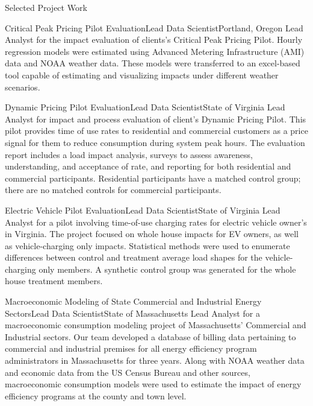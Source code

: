\documentclass{resume} %
\begin{document}
\begin{rSection}{Selected Project Work}
	\begin{rSubsection}{Critical Peak Pricing Pilot Evaluation}{}{Lead Data Scientist}{Portland, Oregon}
Lead Analyst for the impact evaluation of clients's Critical Peak Pricing Pilot. Hourly regression models were estimated using Advanced Metering Infrastructure (AMI) data and NOAA weather data. These models were transferred to an excel-based tool capable of estimating and visualizing impacts under different weather scenarios. 
	\end{rSubsection}
	
	\begin{rSubsection}{Dynamic Pricing Pilot Evaluation}{}{Lead Data Scientist}{State of Virginia}
Lead Analyst for impact and process evaluation of client's Dynamic Pricing Pilot. This pilot provides time of use rates to residential and commercial customers as a price signal for them to reduce consumption during system peak hours. The evaluation report includes a load impact analysis, surveys to assess awareness, understanding, and acceptance of rate, and reporting for both residential and commercial participants. Residential participants have a matched control group; there are no matched controls for commercial participants.
	\end{rSubsection}
	
  \pagebreak
	
	\begin{rSubsection}{Electric Vehicle Pilot Evaluation}{}{Lead Data Scientist}{State of Virginia}
Lead Analyst for a pilot involving time-of-use charging rates for electric vehicle owner's in Virginia. The project focused on whole house impacts for EV owners, as well as vehicle-charging only impacts. Statistical methods were used to enumerate differences between control and treatment average load shapes for the vehicle-charging only members. A synthetic control group was generated for the whole house treatment members.
	\end{rSubsection}  

	\begin{rSubsection}{Macroeconomic Modeling of State Commercial and Industrial Energy Sectors}{}{Lead Data Scientist}{State of Massachusetts}
	Lead Analyst for a macroeconomic consumption modeling project of Massachusetts' Commercial and Industrial sectors. Our team developed a database of billing data pertaining to commercial and industrial premises for all energy efficiency program administrators in Massachusetts for three years. Along with NOAA weather data and economic data from the US Census Bureau and other sources, macroeconomic consumption models were used to estimate the impact of energy efficiency programs at the county and town level. 
	\end{rSubsection}  


\end{rSection}
\end{document}
